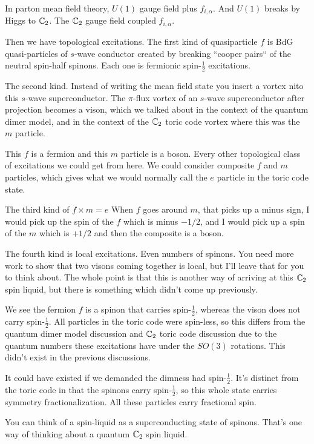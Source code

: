 In parton mean field theory,
$U(1)$ gauge field plus $f_{i,\alpha}$.
And $U(1)$ breaks by Higgs to $\mathbb{C}_2$.
The $\mathbb{C}_2$ gauge field coupled $f_{i,\alpha}$.

Then we have topological excitations.
The first kind of quasiparticle $f$ is BdG quasi-particles of $s$-wave conductor
created by breaking ``cooper pairs`` of the neutral spin-half spinons.
Each one is fermionic spin-$\frac{1}{2}$ excitations.

The second kind.
Instead of writing the mean field state you insert a vortex nito this
$s$-wave superconductor.
The $\pi$-flux vortex of an $s$-wave superconductor after projection becomes a
vison,
which we talked about in the context of the quantum dimer model,
and in the context of the $\mathbb{C}_2$ toric code vortex where this was the $m$
particle.

This $f$ is a fermion and this $m$ particle is a boson.
Every other topological class of excitations we could get from here.
We could consider composite $f$ and $m$ particles,
which gives what we would normally call the $e$ particle in the toric code
state.

The third kind of $f\times m = e$
When $f$ goes around $m$,
that picks up a minus sign,
I would pick up the spin of the $f$ which is minus $-1/2$,
and I would pick up a spin of the $m$ which is $+1/2$ and then the composite is
a boson.

The fourth kind is local excitations.
Even numbers of spinons.
You need more work to show that two visons coming together is local,
but I'll leave that for you to think about.
The whole point is that this is another way of arriving at this $\mathbb{C}_2$ spin
liquid,
but there is something which didn't come up previously.

We see the fermion $f$ is a spinon that carries spin-$\frac{1}{2}$,
whereas the vison does not carry spin-$\frac{1}{2}$.
All particles in the toric code were spin-less,
so this differs from the quantum dimer model discussion and $\mathbb{C}_2$ toric code
discussion due to the quantum numbers these excitations have under the $SO(3)$
rotations.
This didn't exist in the previous discussions.

It could have existed if we demanded the dimness had spin-$\frac{1}{2}$.
It's distinct from the toric code in that the spinons carry
spin-$\frac{1}{2}$,
so this whole state carries symmetry fractionalization.
All these particles carry fractional spin.

You can think of a spin-liquid as a superconducting state of spinons.
That's one way of thinking about a quantum $\mathbb{C}_2$ spin liquid.


